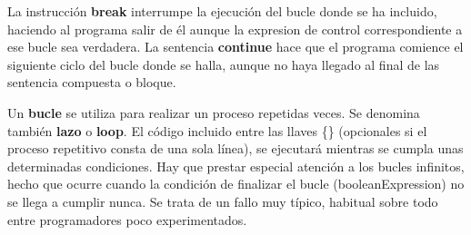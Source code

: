 La instrucción \textbf{break} interrumpe la ejecución del bucle donde se ha incluido, haciendo al
programa salir de él aunque la expresion de control correspondiente a ese bucle sea
verdadera.
La sentencia \textbf{continue} hace que el programa comience el siguiente ciclo del bucle donde
se halla, aunque no haya llegado al final de las sentencia compuesta o bloque.

Un \textbf{bucle} se utiliza para realizar un proceso repetidas veces. Se denomina también \textbf{lazo} o \textbf{loop}. El
código incluido entre las llaves \{\} (opcionales si el proceso repetitivo consta de una sola línea), se
ejecutará mientras se cumpla unas determinadas condiciones. Hay que prestar especial atención a
los bucles infinitos, hecho que ocurre cuando la condición de finalizar el bucle
(booleanExpression) no se llega a cumplir nunca. Se trata de un fallo muy típico, habitual sobre
todo entre programadores poco experimentados.